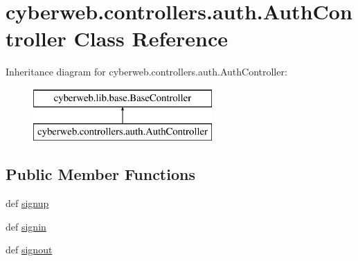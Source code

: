 \hypertarget{classcyberweb_1_1controllers_1_1auth_1_1_auth_controller}{\section{cyberweb.\-controllers.\-auth.\-Auth\-Controller \-Class \-Reference}
\label{classcyberweb_1_1controllers_1_1auth_1_1_auth_controller}
}
\-Inheritance diagram for cyberweb.\-controllers.\-auth.\-Auth\-Controller\-:\begin{figure}[H]
\begin{center}
\leavevmode
\includegraphics[height=2.000000cm]{classcyberweb_1_1controllers_1_1auth_1_1_auth_controller}
\end{center}
\end{figure}
\subsection*{\-Public \-Member \-Functions}
\begin{DoxyCompactItemize}
\item 
def \hyperlink{classcyberweb_1_1controllers_1_1auth_1_1_auth_controller_a1418233f76bd09b971a18796d7dfb952}{signup}
\item 
def \hyperlink{classcyberweb_1_1controllers_1_1auth_1_1_auth_controller_ae354668bd94e283a5b62ef1e766b3e2b}{signin}
\item 
def \hyperlink{classcyberweb_1_1controllers_1_1auth_1_1_auth_controller_ace250026f47e38526dccd9be7d899085}{signout}
\end{DoxyCompactItemize}


